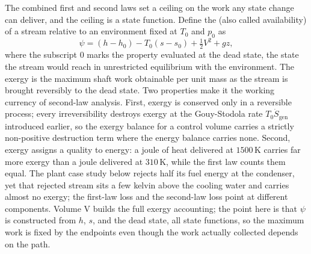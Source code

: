 \begin{mastery}
The combined first and second laws set a ceiling on the work any state
change can deliver, and the ceiling is a state function. Define the
 (also called availability) of a stream relative to
an environment fixed at $T_0$ and $p_0$ as
\[
\psi = (h - h_0) - T_0 (s - s_0) + \tfrac12 V^2 + g z,
\]
where the subscript $0$ marks the property evaluated at the dead state,
the state the stream would reach in unrestricted equilibrium with the
environment. The exergy is the maximum shaft work obtainable per unit
mass as the stream is brought reversibly to the dead state. Two
properties make it the working currency of second-law analysis. First,
exergy is conserved only in a reversible process; every irreversibility
destroys exergy at the Gouy-Stodola rate $T_0 \dot{S}_{\text{gen}}$
introduced earlier, so the exergy balance for a control volume carries a
strictly non-positive destruction term where the energy balance carries
none. Second, exergy assigns a quality to energy: a joule of heat
delivered at $1500\,\si{\kelvin}$ carries far more exergy than a joule
delivered at $310\,\si{\kelvin}$, while the first law counts them
equal. The plant case study below rejects half its fuel energy at the
condenser, yet that rejected stream sits a few kelvin above the cooling
water and carries almost no exergy; the first-law loss and the
second-law loss point at different components. Volume V builds the full
exergy accounting; the point here is that $\psi$ is constructed from $h$,
$s$, and the dead state, all state functions, so the maximum work is
fixed by the endpoints even though the work actually collected depends on
the path.
\end{mastery}

